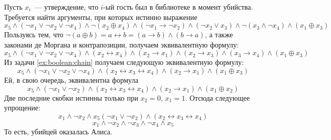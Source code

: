 \begin{Answer}
    \noindent
    Пусть $ x_i $~--- утверждение, что $ i $-ый гость был в библиотеке в момент убийства.
    Требуется найти аргументы, при которых истинно выражение
    \[
        x_5 \wedge (\neg x_1 \vee \neg x_2 \vee \neg x_4 ) \wedge \neg (x_2 \oplus x_4) \wedge
        (\neg x_1 \rightarrow \neg x_2) \wedge (\neg x_2 \vee x_3) \wedge \neg (x_3 \wedge \neg x_4) \wedge (x_1 \oplus x_3)
    \]
    Пользуясь тем, что $ \neg (a \oplus b) = a \leftrightarrow b = (a \rightarrow b) \wedge (b \rightarrow a) $, а также законами де Моргана и контрапозиции,
    получаем эквивалентную формулу:
    \[
        x_5 \wedge (\neg x_1 \vee \neg x_2 \vee \neg x_4 ) \wedge (x_2 \leftrightarrow x_4) \wedge (x_2 \rightarrow x_1) \wedge (x_2 \rightarrow x_3) \wedge
        (x_3 \rightarrow x_4) \wedge (x_1 \oplus x_3)
    \]
    Из задачи \ref{ex:boolean:chain} получаем следующую эквивалентную формулу:
    \[
        x_5 \wedge (\neg x_1 \vee \neg x_2 \vee \neg x_4 ) \wedge (x_2 \leftrightarrow x_3 \leftrightarrow x_4) \wedge (x_2 \rightarrow x_1) \wedge (x_1 \oplus x_3)
    \]
    Ей, в свою очередь, эквивалентна формула
    \[
        x_5 \wedge (\neg x_1 \vee \neg x_2 ) \wedge (x_2 \leftrightarrow x_3 \leftrightarrow x_4) \wedge (x_2 \rightarrow x_1) \wedge (x_1 \oplus x_2)
    \]
    Две последние скобки истинны только при $ x_2 = 0 $, $ x_1 = 1 $.
    Отсюда следующее упрощение:
    \[
        x_1 \wedge \neg x_2 \wedge x_5 (\neg x_1 \vee \neg x_2 ) \wedge (x_2 \leftrightarrow x_3 \leftrightarrow x_4)
    \]
    \[
        x_1 \wedge \neg x_2 \wedge \neg x_3 \wedge \neg x_4 \wedge x_5
    \]
    То есть, убийцей оказалась Алиса.
\end{Answer}


%



